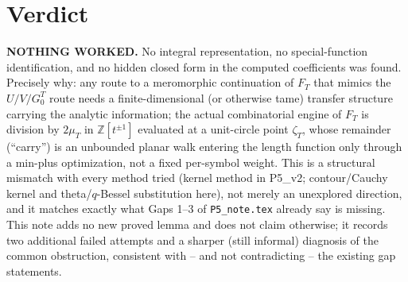 \documentclass[11pt]{article}
\begin{document}
\section*{Verdict}

\textbf{NOTHING WORKED.} No integral representation, no special-function
identification, and no hidden closed form in the computed coefficients was
found. Precisely why: any route to a meromorphic continuation of $F_T$ that
mimics the $U/V/G_0^T$ route needs a finite-dimensional (or otherwise tame)
transfer structure carrying the analytic information; the actual combinatorial
engine of $F_T$ is division by $2\mu_T$ in $\mathbb Z[t^{\pm1}]$ evaluated at a
unit-circle point $\zeta_T$, whose remainder (``carry'') is an unbounded planar
walk entering the length function only through a min-plus optimization, not a
fixed per-symbol weight. This is a structural mismatch with every method tried
(kernel method in P5\_v2; contour/Cauchy kernel and theta/$q$-Bessel
substitution here), not merely an unexplored direction, and it matches exactly
what Gaps 1--3 of \texttt{P5\_note.tex} already say is missing. This note adds
no new proved lemma and does not claim otherwise; it records two additional
failed attempts and a sharper (still informal) diagnosis of the common
obstruction, consistent with -- and not contradicting -- the existing gap
statements.
\end{document}
